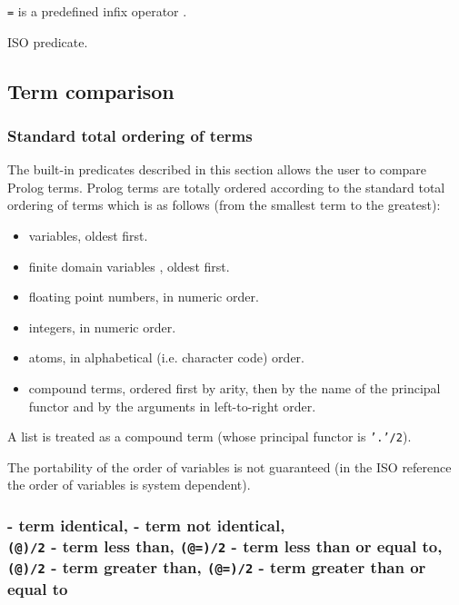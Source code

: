 \texttt{{\bs}=} is a predefined infix operator .

\PlErrorsNone

\Portability

ISO predicate.

\subsection{Term comparison}

\subsubsection{Standard total ordering of terms}
\label{Standard-total-ordering-of-terms}
The built-in predicates described in this section allows the user to compare
Prolog terms. Prolog terms are totally ordered according to the standard
total ordering of terms which is as follows (from the smallest term to the
greatest):

\begin{itemize}

\item variables, oldest first.

\item finite domain variables , oldest
first.

\item floating point numbers, in numeric order.

\item integers, in numeric order.

\item atoms, in alphabetical (i.e. character code) order.

\item compound terms, ordered first by arity, then by the name of the
principal functor and by the arguments in left-to-right order.

\end{itemize}

A list is treated as a compound term (whose principal functor is
\texttt{'.'/2}).

The portability of the order of variables is not guaranteed (in the ISO
reference the order of variables is system dependent).

\subsubsection{ - term identical, \label{(==)/2}
                - term not identical, \\
               \texttt{(@{\lt})/2} - term less than,
               \texttt{(@={\lt})/2} - term less than or equal to, \\
               \texttt{(@{\gt})/2} - term greater than,
               \texttt{(@{\gt}=)/2} - term greater than or equal to}

